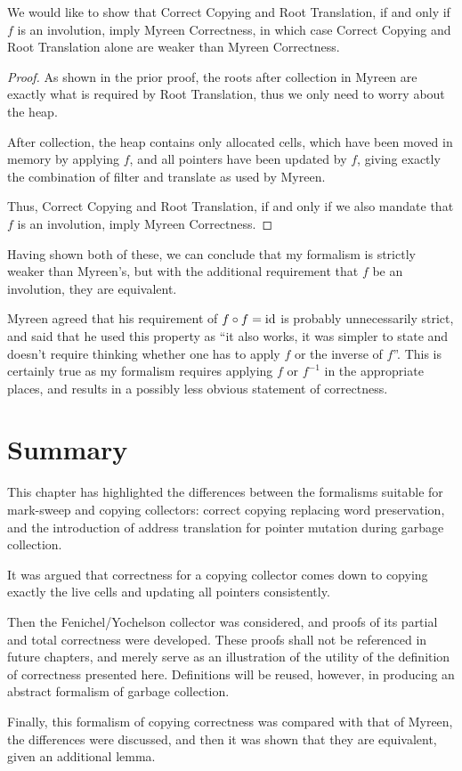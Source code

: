 \begin{theorem}
  We would like to show that Correct Copying and Root Translation, if
  and only if $f$ is an involution, imply Myreen Correctness, in which
  case Correct Copying and Root Translation alone are weaker than
  Myreen Correctness.

  \begin{proof}
    As shown in the prior proof, the roots after collection in Myreen
    are exactly what is required by Root Translation, thus we only
    need to worry about the heap.

    After collection, the heap contains only allocated cells, which
    have been moved in memory by applying $f$, and all pointers have
    been updated by $f$, giving exactly the combination of filter and
    translate as used by Myreen.

    Thus, Correct Copying and Root Translation, if and only if we also
    mandate that $f$ is an involution, imply Myreen Correctness.
  \end{proof}
\end{theorem}

Having shown both of these, we can conclude that my formalism is
strictly weaker than Myreen's, but with the additional requirement
that $f$ be an involution, they are equivalent.

Myreen\cite{MyreenEmail} agreed that his requirement of $f \circ f =
\mathrm{id}$ is probably unnecessarily strict, and said that he used this
property as ``it also works, it was simpler to state and doesn't
require thinking whether one has to apply $f$ or the inverse of
$f$''. This is certainly true as my formalism requires applying $f$ or
$f^{-1}$ in the appropriate places, and results in a possibly less
obvious statement of correctness.

\section{Summary}
\label{sec:copying-summary}

This chapter has highlighted the differences between the formalisms
suitable for mark-sweep and copying collectors: correct copying
replacing word preservation, and the introduction of address
translation for pointer mutation during garbage collection.

It was argued that correctness for a copying collector comes down to
copying exactly the live cells and updating all pointers consistently.

Then the Fenichel/Yochelson\cite{Fenichel69} collector was considered,
and proofs of its partial and total correctness were developed. These
proofs shall not be referenced in future chapters, and merely serve as
an illustration of the utility of the definition of correctness
presented here. Definitions will be reused, however, in producing an
abstract formalism of garbage collection.

Finally, this formalism of copying correctness was compared with that
of Myreen\cite{Myreen10}, the differences were discussed, and then it
was shown that they are equivalent, given an additional lemma.
